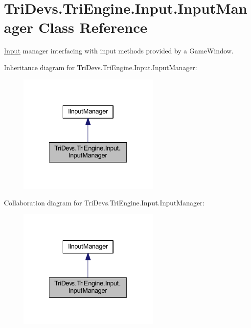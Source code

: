 \hypertarget{class_tri_devs_1_1_tri_engine_1_1_input_1_1_input_manager}{\section{Tri\-Devs.\-Tri\-Engine.\-Input.\-Input\-Manager Class Reference}
\label{class_tri_devs_1_1_tri_engine_1_1_input_1_1_input_manager}
}


\hyperlink{namespace_tri_devs_1_1_tri_engine_1_1_input}{Input} manager interfacing with input methods provided by a Game\-Window.  




Inheritance diagram for Tri\-Devs.\-Tri\-Engine.\-Input.\-Input\-Manager\-:
\nopagebreak
\begin{figure}[H]
\begin{center}
\leavevmode
\includegraphics[width=198pt]{class_tri_devs_1_1_tri_engine_1_1_input_1_1_input_manager__inherit__graph}
\end{center}
\end{figure}


Collaboration diagram for Tri\-Devs.\-Tri\-Engine.\-Input.\-Input\-Manager\-:
\nopagebreak
\begin{figure}[H]
\begin{center}
\leavevmode
\includegraphics[width=198pt]{class_tri_devs_1_1_tri_engine_1_1_input_1_1_input_manager__coll__graph}
\end{center}
\end{figure}
